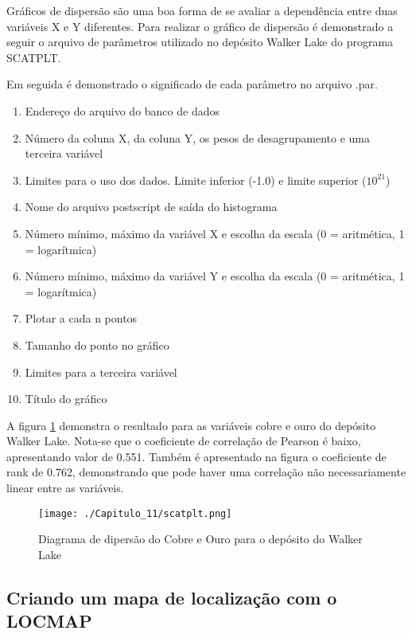 Gráficos de dispersão são uma boa forma de se avaliar a dependência entre duas variáveis X e Y diferentes. Para realizar o gráfico de dispersão é demonstrado a seguir o arquivo de parâmetros utilizado no depósito Walker Lake do programa SCATPLT. 

\FloatBarrier 
\begingroup
{}

\endgroup
\FloatBarrier

Em seguida é demonstrado o significado de cada parâmetro no arquivo .par. 

\begin{enumerate}
	\item Endereço do arquivo do banco de dados 
	\item Número da coluna X, da coluna Y, os pesos de desagrupamento e uma terceira variável  
	\item Limites para o uso dos dados. Limite inferior (-1.0) e limite superior ($10 ^{21} $)
	\item Nome do arquivo postscript de saída do histograma 
	\item Número mínimo, máximo da variável X e escolha da escala (0 = aritmética, 1 = logarítmica)
	\item Número mínimo, máximo da variável Y e escolha da escala (0 = aritmética, 1 = logarítmica)
	\item Plotar a cada n pontos 
	\item Tamanho do ponto no gráfico 
	\item Limites para a terceira variável 
	\item Título do gráfico
\end{enumerate}
\FloatBarrier

A figura \ref{dispersao_GSLIB} demonstra o resultado para as variáveis cobre e ouro do depósito Walker Lake. Nota-se que o coeficiente de correlação de Pearson é baixo, apresentando valor de 0.551. Também é apresentado na figura o coeficiente de rank de 0.762, demonstrando que pode haver uma correlação não necessariamente linear entre as variáveis. 

\FloatBarrier
\begin{figure}[h]
	\centering
	\texttt{[image: ./Capitulo\_11/scatplt.png]}	
	\caption{ Diagrama de dipersão do Cobre e Ouro para o depósito do Walker Lake}
	\label{dispersao_GSLIB}
\end{figure}
\FloatBarrier

\subsection{Criando um mapa de localização com o LOCMAP}

